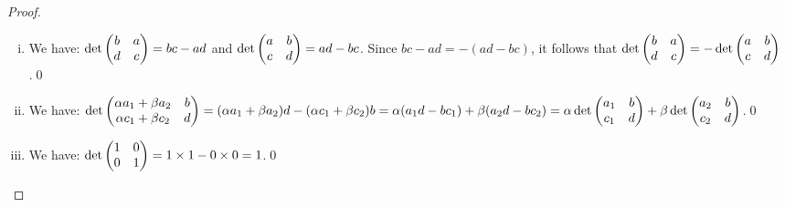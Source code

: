 \begin{proof}
	\renewcommand{\qedsymbol}{$\blacksquare$}
	\begin{enumerate}[(i)]
		\item We have: $\det \begin{pmatrix} b &a\\ d &c \end{pmatrix}=bc-ad$ and $\det \begin{pmatrix} a &b\\ c &d \end{pmatrix}=ad-bc$.
		Since $bc-ad=-(ad-bc)$, it follows that $\det \begin{pmatrix} b &a\\ d &c \end{pmatrix}=-\det \begin{pmatrix} a &b\\ c &d \end{pmatrix}$.\qed
		\item We have: $\det \begin{pmatrix} \alpha a_1+\beta a_2 &b\\ \alpha c_1+\beta c_2 &d \end{pmatrix}=(\alpha a_1+\beta a_2)d-(\alpha c_1+\beta c_2)b=\alpha(a_1d-bc_1)+\beta(a_2d-bc_2)=\alpha\det \begin{pmatrix} a_1 &b\\ c_1 &d \end{pmatrix}+\beta\det \begin{pmatrix} a_2 &b\\ c_2 &d \end{pmatrix}$.\qed
		\item We have: $\det \begin{pmatrix} 1 &0\\ 0 &1 \end{pmatrix}=1\times 1-0\times 0=1$.\qed
	\end{enumerate}
	\renewcommand{\qedsymbol}{}
\end{proof}